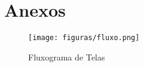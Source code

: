 \chapter{Anexos}
\begin{figure}[h]
    \centering %
    \caption{Fluxograma de Telas}
	\label{fig_fluxo}
	\texttt{[image: figuras/fluxo.png]}\\
\end{figure}